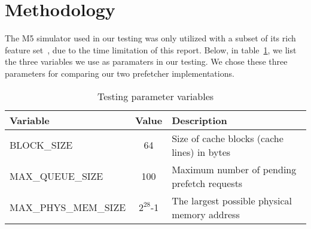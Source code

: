 \section{Methodology}

The M5 simulator used in our testing was only utilized with a subset of its rich
feature set~\cite{user_doc}, due to the time limitation of this report.
 Below, in table~\ref{tab:test-params}, we
list the three variables we use as paramaters in our testing. We chose these
three parameters for comparing our two prefetcher implementations.

\begin{table}[h]
	\caption{Testing parameter variables}
	\begin{tabularx}{\linewidth}{|X|c|X|}
	\hline
	Variable & Value & Description \\
	\hline
	BLOCK\_SIZE & 64 & Size of cache blocks (cache lines) in bytes \\
	\hline
	MAX\_QUEUE\_SIZE & 100 & Maximum number of pending prefetch requests \\
	\hline
	MAX\_PHYS\_MEM\_SIZE & $2^{28}$-1 & The largest possible physical memory address \\
	\hline
	\end{tabularx}
	\label{tab:test-params}
\end{table}

